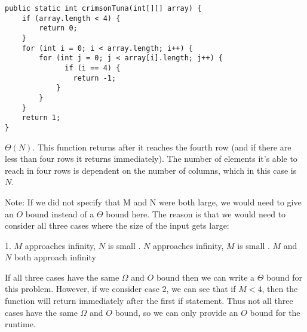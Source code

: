 \begin{blocksection}
\question

\begin{lstlisting}
public static int crimsonTuna(int[][] array) {
    if (array.length < 4) {
        return 0;
    }
    for (int i = 0; i < array.length; i++) {
        for (int j = 0; j < array[i].length; j++) {
              if (i == 4) {
                return -1;
            }
        }
    }
    return 1;
}
\end{lstlisting}
\end{blocksection}

\begin{blocksection}
\begin{solution}
$\Theta(N)$. This function returns after it reaches the fourth row (and if there are
less than four rows it returns immediately). The number of elements it's able
to reach in four rows is dependent on the number of columns, which in this case
is $N$. \newline

Note: If we did not specify that M and N were both large, we would need to give an
$O$ bound instead of a $\Theta$ bound here. The reason is that we would need to
consider all three cases where the size of the input gets large: \newline 

1. $M$ approaches infinity, $N$ is small . $N$ approaches infinity, $M$ is small . $M$ and $N$ both approach infinity \newline

If all three cases have the same $\Omega$ and $O$ bound then we can write a
$\Theta$ bound for this problem. However, if we consider case 2, we can see
that if $M < 4$, then the function will return immediately after the first
if statement. Thus not all three cases have the same  $\Omega$ and $O$ bound,
so we can only provide an $O$ bound for the runtime.
\end{solution}
\end{blocksection}
